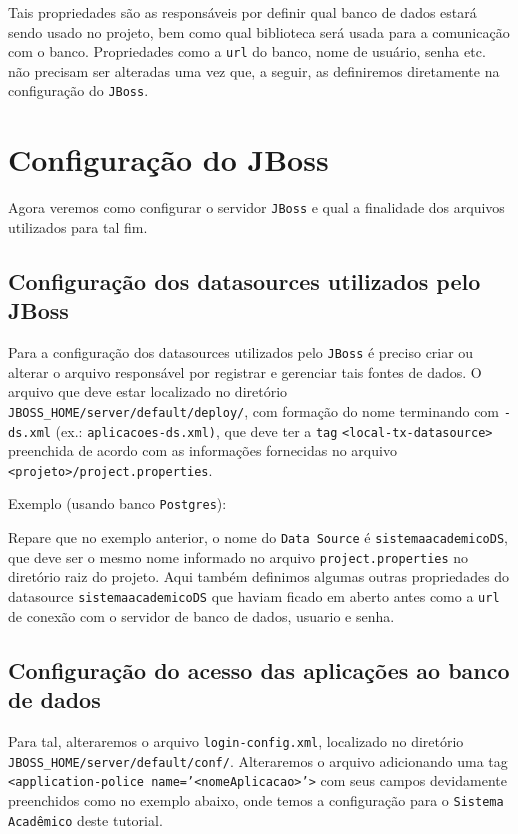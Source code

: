 Tais propriedades são as responsáveis por definir qual banco de dados estará
sendo usado no projeto, bem como qual biblioteca será usada para a comunicação
com o banco. Propriedades como a \texttt{url} do banco, nome de usuário, senha
etc. não precisam ser alteradas uma vez que, a seguir, as definiremos diretamente na
configuração do \texttt{JBoss}.

\section{Configuração do JBoss}
Agora veremos como configurar o servidor \texttt{JBoss} e qual a finalidade dos
arquivos utilizados para tal fim. 

\subsection{Configuração dos datasources utilizados pelo JBoss}
Para a configuração dos datasources utilizados pelo \texttt{JBoss} é preciso
criar ou alterar o arquivo responsável por registrar e gerenciar tais fontes de dados.
O arquivo que deve estar localizado no diretório
\texttt{JBOSS\_HOME/server/default/deploy/}, com formação do nome terminando com
\texttt{-ds.xml} (ex.: \texttt{aplicacoes-ds.xml)}, que deve ter a \texttt{tag}
\texttt{<local-tx-datasource>} preenchida de acordo com as informações 
fornecidas no arquivo \texttt{<projeto>/project.properties}.

Exemplo (usando banco \texttt{Postgres}):

\begin{framed}
	
\end{framed}

Repare que no exemplo anterior, o nome do \texttt{Data Source} é
\texttt{sistemaacademicoDS}, que deve ser o mesmo nome informado no arquivo
\texttt{project.properties} no diretório raiz do projeto. Aqui também definimos algumas outras propriedades do
datasource \texttt{sistemaacademicoDS} que haviam ficado em aberto antes como a
\texttt{url} de conexão com o servidor de banco de dados, usuario e senha.

\subsection{Configuração do acesso das aplicações ao banco de dados}
Para tal, alteraremos o arquivo \texttt{login-config.xml}, localizado no
diretório \texttt{JBOSS\_HOME/server/default/conf/}. Alteraremos o arquivo
adicionando uma tag \texttt{<application-police name='<nomeAplicacao>'>} com
seus campos devidamente preenchidos como no exemplo abaixo, onde temos a
configuração para o \texttt{Sistema Acadêmico} deste tutorial.

